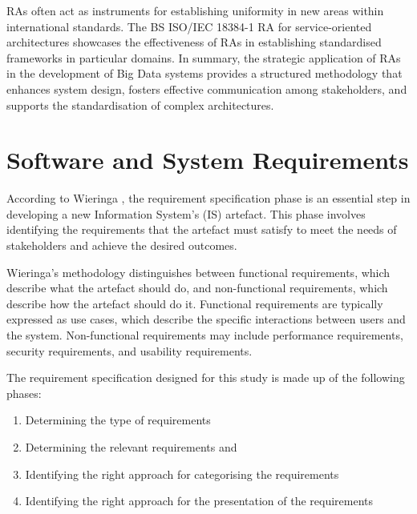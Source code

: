 \documentclass[preprint,12pt]{elsarticle}
\begin{document}
RAs often act as instruments for establishing uniformity in new areas within international standards. The BS ISO/IEC 18384-1 RA \cite{Iso18384-1} for service-oriented architectures showcases the effectiveness of RAs in establishing standardised frameworks in particular domains. In summary, the strategic application of RAs in the development of Big Data systems provides a structured methodology that enhances system design, fosters effective communication among stakeholders, and supports the standardisation of complex architectures. 

\section{Software and System Requirements}

\label{sec:software_and_system_requirements}

According to Wieringa \cite{wieringa2014design}, the requirement specification phase is an essential step in developing a new Information System's (IS) artefact. This phase involves identifying the requirements that the artefact must satisfy to meet the needs of stakeholders and achieve the desired outcomes.

Wieringa's methodology distinguishes between functional requirements, which describe what the artefact should do, and non-functional requirements, which describe how the artefact should do it. Functional requirements are typically expressed as use cases, which describe the specific interactions between users and the system. Non-functional requirements may include performance requirements, security requirements, and usability requirements.

The requirement specification designed for this study is made up of the following phases: 

\begin{enumerate}

    \item Determining the type of requirements 

    \item Determining the relevant requirements and 

    \item Identifying the right approach for categorising the requirements 

    \item Identifying the right approach for the presentation of the requirements 

\end{enumerate}
\end{document}
